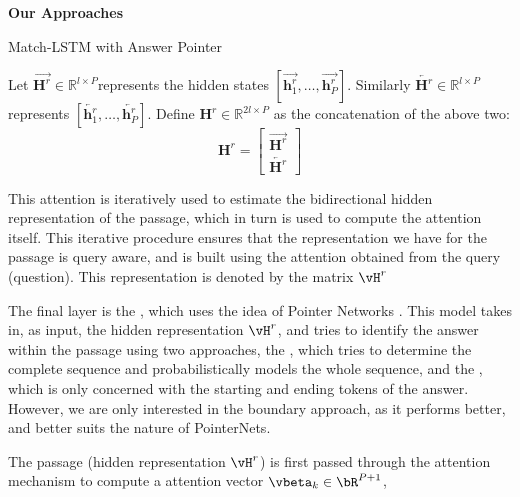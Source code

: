 \documentclass{article}
\def\*#1{\mathbf{#1}}
\begin{document}
\begin{psection}{\textbf{Our Approaches}}
\begin{psubsection}{Match-LSTM with Answer Pointer}
\begin{enumerate}[label=\bt{\theenumi.}]
        Let $\overrightarrow{\*H^r} \in \mathbb{R}^{l\times P}$represents the hidden states $[\overrightarrow{\*h_1^r},\dots,\overrightarrow{\*h_P^r}]$. Similarly $\overleftarrow{\*H^r}\in \mathbb{R}^{l\times P}$ represents $[\overleftarrow{\*h_1^r},\dots,\overleftarrow{\*h_P^r}]$. Define $\*H^r \in \mathbb{R}^{2l \times P}$ as the concatenation of the above two:
        $$\*H^r = \begin{bmatrix}
        \overrightarrow{\*H^r}\\ \overleftarrow{\*H^r}
        \end{bmatrix}$$

		This attention is iteratively used to estimate the bidirectional hidden representation of the passage, which in turn is used to compute the attention itself.
		This iterative procedure ensures that the representation we have for the passage is query aware, and is built using the attention obtained from the query (question).
		This representation is denoted by the matrix $\vH^r$

				The final layer is the , which uses the idea of Pointer Networks \cite{pointernet}.
				This model takes in, as input, the hidden representation $\vH^r$, and tries to identify the answer within the passage using two approaches, the , which tries to determine the complete sequence and probabilistically models the whole sequence, and the , which is only concerned with the starting and ending tokens of the answer. However, we are only interested in the boundary approach, as it performs better, and better suits the nature of PointerNets.

				The passage (hidden representation $\vH^r$) is first passed through the attention mechanism to compute a attention vector $\vbeta_k \in \bR^{P + 1}$,


\end{enumerate}
\end{psubsection}
\end{psection}
\end{document}

